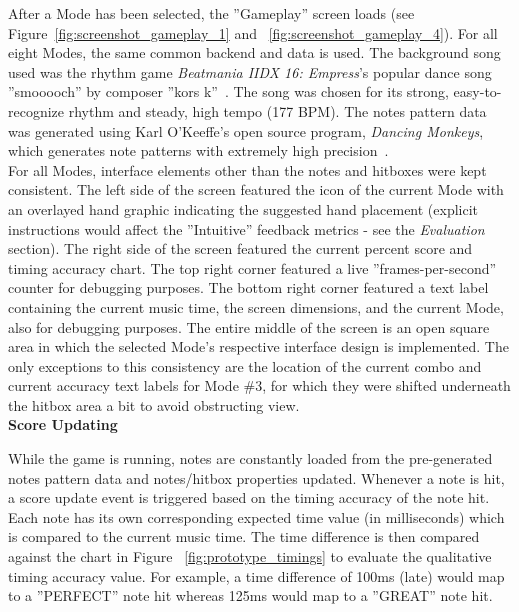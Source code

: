 \documentclass{sig-alternate}
\begin{document}
After a Mode has been selected, the ''Gameplay'' screen loads (see Figure~\ref{fig:screenshot_gameplay_1} and ~\ref{fig:screenshot_gameplay_4}). For all eight Modes, the same common backend and data is used. The background song used was the rhythm game \textit{Beatmania IIDX 16: Empress}'s popular dance song ''smooooch'' by composer ''kors k''~\cite{smooooch}. The song was chosen for its strong, easy-to-recognize rhythm and steady, high tempo (177 BPM). The notes pattern data was generated using Karl O'Keeffe's open source program, \textit{Dancing Monkeys}, which generates note patterns with extremely high precision~\cite{dancing_monkeys}.\\

For all Modes, interface elements other than the notes and hitboxes were kept consistent. The left side of the screen featured the icon of the current Mode with an overlayed hand graphic indicating the suggested hand placement (explicit instructions would affect the ''Intuitive'' feedback metrics - see the \textit{Evaluation} section). The right side of the screen featured the current percent score and timing accuracy chart. The top right corner featured a live ''frames-per-second'' counter for debugging purposes. The bottom right corner featured a text label containing the current music time, the screen dimensions, and the current Mode, also for debugging purposes. The entire middle of the screen is an open square area in which the selected Mode's respective interface design is implemented. The only exceptions to this consistency are the location of the current combo and current accuracy text labels for Mode \#3, for which they were shifted underneath the hitbox area a bit to avoid obstructing view.\\

\newpage
\noindent \textbf{Score Updating}

While the game is running, notes are constantly loaded from the pre-generated notes pattern data and notes/hitbox properties updated. Whenever a note is hit, a score update event is triggered based on the timing accuracy of the note hit. Each note has its own corresponding expected time value (in milliseconds) which is compared to the current music time. The time difference is then compared against the chart in Figure ~\ref{fig:prototype_timings} to evaluate the qualitative timing accuracy value. For example, a time difference of 100ms (late) would map to a ''PERFECT'' note hit whereas 125ms would map to a ''GREAT'' note hit.
\end{document}
